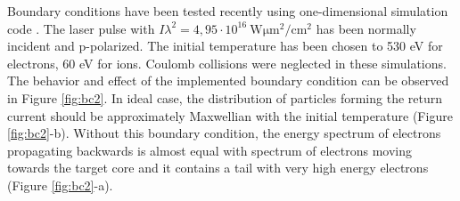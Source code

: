 Boundary conditions have been tested recently using one-dimensional simulation code \cite{lichters}. The laser pulse with $ I\lambda^{2} = 4,95 \cdot 10^{16} \: \mathrm{W \mu m^2/cm^2} $ has been normally incident and p-polarized. The initial temperature has been chosen to 530 eV for electrons, 60 eV for ions. Coulomb collisions were neglected in these simulations. The behavior and effect of the implemented boundary condition can be observed in Figure \ref{fig:bc2}. In ideal case, the distribution of particles forming the return current should be approximately Maxwellian with the initial temperature (Figure \ref{fig:bc2}-b). Without this boundary condition, the energy spectrum of electrons propagating backwards is almost equal with spectrum of electrons moving towards the target core and it contains a tail with very high energy electrons (Figure \ref{fig:bc2}-a).



